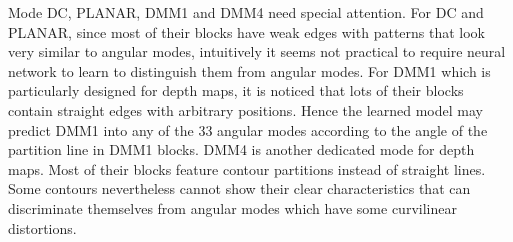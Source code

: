 Mode DC, PLANAR, DMM1 and DMM4 need special attention.
For DC and PLANAR, since most of their blocks
have weak edges with patterns that look
very similar to angular modes,
intuitively it seems not practical to require 
neural network to learn to 
distinguish them from angular modes.
For DMM1 which is particularly designed for depth maps,
it is noticed that lots of their
blocks contain straight edges with arbitrary positions.
Hence the learned model may predict DMM1 into any
of the 33 angular modes according to the angle of
the partition line in DMM1 blocks.
DMM4 is another dedicated mode for depth maps.
Most of their blocks feature contour partitions instead of
straight lines.
Some contours nevertheless cannot show 
their clear characteristics that can 
discriminate themselves
from angular modes which have some curvilinear distortions.

